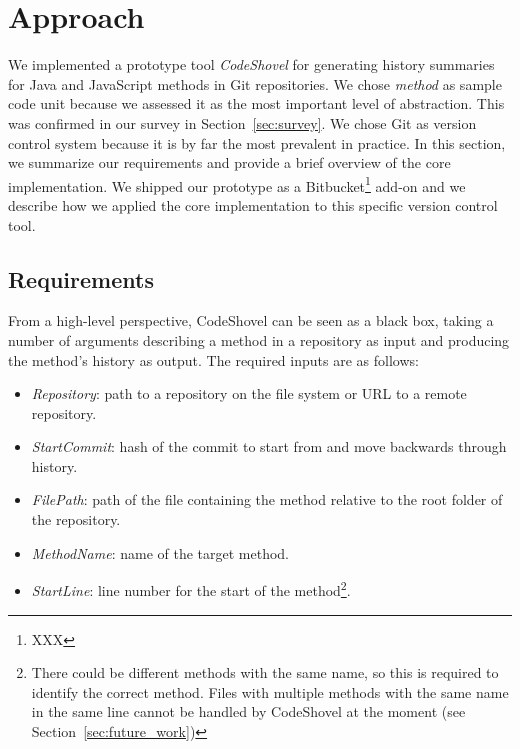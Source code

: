 
\section{Approach}
\label{sec:approach}

We implemented a prototype tool \textit{CodeShovel} for generating history summaries for Java and JavaScript methods in Git repositories. We chose \textit{method} as sample code unit because we assessed it as the most important level of abstraction. This was confirmed in our survey in Section~\ref{sec:survey}. We chose Git as version control system because it is by far the most prevalent in practice\cite{XXX}. In this section, we summarize our requirements and provide a brief overview of the core implementation. We shipped our prototype as a Bitbucket\footnote{XXX} add-on and we describe how we applied the core implementation to this specific version control tool.

\subsection{Requirements}
\label{sec:requirements}

From a high-level perspective, CodeShovel can be seen as a black box, taking a number of arguments describing a method in a repository as input and producing the method's history as output. The required inputs are as follows:

\begin{itemize}
	\item \textit{Repository}: path to a repository on the file system or URL to a remote repository.
	\item \textit{StartCommit}: hash of the commit to start from and move backwards through history.
	\item \textit{FilePath}: path of the file containing the method relative to the root folder of the repository.
	\item \textit{MethodName}: name of the target method.
	\item \textit{StartLine}: line number for the start of the method\footnote{There could be different methods with the same name, so this is required to identify the correct method. Files with multiple methods with the same name in the same line cannot be handled by CodeShovel at the moment (see Section~\ref{sec:future_work})}.
\end{itemize}

